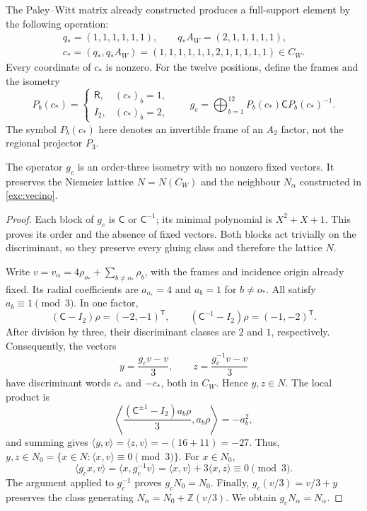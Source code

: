 The Paley--Witt matrix already constructed produces a full-support
element by the following operation:
\begin{equation}
 \begin{gathered}
 q_*=(1,1,1,1,1,1),\qquad q_*A_W=(2,1,1,1,1,1),\\
 c_*=(q_*,q_*A_W)
 =(1,1,1,1,1,1,2,1,1,1,1,1)\in C_W.
 \end{gathered}
 \label{km:palabra-total}
\end{equation}
Every coordinate of \(c_*\) is nonzero. For the twelve positions,
define the frames and the isometry
\begin{equation}
 P_b(c_*)=
 \begin{cases}\mathsf R,&(c_*)_b=1,\\I_2,&(c_*)_b=2,\end{cases}
 \qquad
 g_c=\bigoplus_{b=1}^{12}P_b(c_*)\mathsf C P_b(c_*)^{-1}.
 \label{km:isometria-ternaria}
\end{equation}
The symbol \(P_b(c_*)\) here denotes an invertible frame of an
\(A_2\) factor, not the regional projector \(P_3\).

\begin{proposition}
\label{km:estabilidad-vecino}
The operator \(g_c\) is an order-three isometry with no nonzero
fixed vectors. It preserves the Niemeier lattice \(N=N(C_W)\) and the
neighbour \(N_\alpha\) constructed in \eqref{exc:vecino}.
\end{proposition}
\begin{proof}
Each block of \(g_c\) is \(\mathsf C\) or \(\mathsf C^{-1}\);
its minimal polynomial is \(X^2+X+1\). This proves its order and
the absence of fixed vectors. Both blocks act trivially on the
discriminant, so they preserve every gluing class and therefore
the lattice \(N\).

Write \(v=v_\alpha=4\rho_{o_*}+\sum_{b\ne o_*}\rho_b\),
with the frames and incidence origin already fixed. Its radial
coefficients are \(a_{o_*}=4\) and \(a_b=1\) for \(b\ne o_*\).
All satisfy \(a_b\equiv1\pmod3\). In one factor,
\[
 (\mathsf C-I_2)\rho=(-2,-1)^{\mathsf T},\qquad
 (\mathsf C^{-1}-I_2)\rho=(-1,-2)^{\mathsf T}.
\]
After division by three, their discriminant classes are
\(2\) and \(1\), respectively. Consequently, the vectors
\begin{equation}
 y=\frac{g_cv-v}{3},\qquad z=\frac{g_c^{-1}v-v}{3}
 \label{km:desplazamientos}
\end{equation}
have discriminant words \(c_*\) and \(-c_*\), both in
\(C_W\). Hence \(y,z\in N\). The local product is
\[
 \left\langle
 \frac{(\mathsf C^{\pm1}-I_2)a_b\rho}{3},a_b\rho
 \right\rangle=-a_b^2,
\]
and summing gives
\(\langle y,v\rangle=\langle z,v\rangle=-(16+11)=-27\).
Thus, \(y,z\in N_0=\{x\in N:\langle x,v\rangle\equiv0\pmod3\}\).
For \(x\in N_0\),
\[
 \langle g_cx,v\rangle
 =\langle x,g_c^{-1}v\rangle
 =\langle x,v\rangle+3\langle x,z\rangle\equiv0\pmod3.
\]
The argument applied to \(g_c^{-1}\) proves \(g_cN_0=N_0\).
Finally, \(g_c(v/3)=v/3+y\) preserves the class generating
\(N_\alpha=N_0+\mathbb Z(v/3)\). We obtain
\(g_cN_\alpha=N_\alpha\).
\end{proof}

